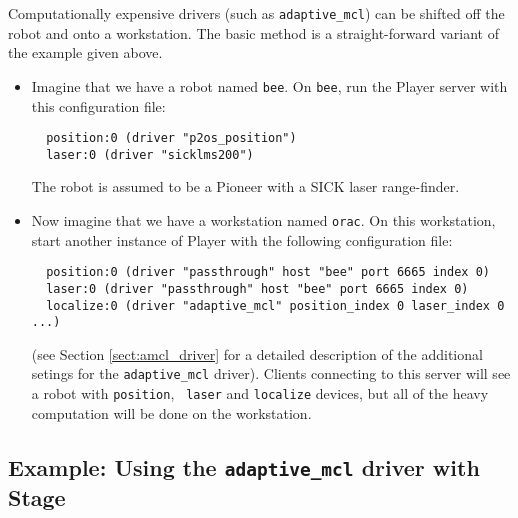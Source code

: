 Computationally expensive drivers (such as {\tt adaptive\_mcl}) can be
shifted off the robot and onto a workstation.  The basic method is
a straight-forward variant of the example given above.
%
\begin{itemize}
\item Imagine that we have a robot named {\tt bee}.  On {\tt bee}, run
the Player server with this configuration file:
  \begin{verbatim}
  position:0 (driver "p2os_position")
  laser:0 (driver "sicklms200")
  \end{verbatim}
The robot is assumed to be a Pioneer with a SICK laser range-finder. 
\item Now imagine that we have a workstation named {\tt orac}.  On
this workstation, start another instance of Player with the
following configuration file:
  \begin{verbatim}
  position:0 (driver "passthrough" host "bee" port 6665 index 0)
  laser:0 (driver "passthrough" host "bee" port 6665 index 0) 
  localize:0 (driver "adaptive_mcl" position_index 0 laser_index 0 ...)
  \end{verbatim}
(see Section \ref{sect:amcl_driver} for a detailed description of the
additional setings for the {\tt adaptive\_mcl} driver).  Clients
connecting to this server will see a robot with {\tt position}, {\tt
laser} and {\tt localize} devices, but all of the heavy computation
will be done on the workstation.
\end{itemize}



\subsection*{Example: Using the {\tt adaptive\_mcl} driver with Stage}

